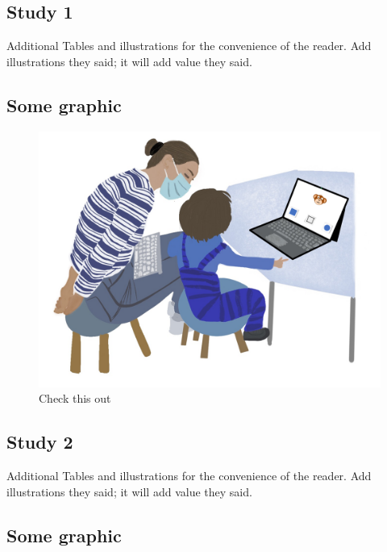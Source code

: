 \documentclass[
  man]{apa6}
\begin{document}
\subsection{Study 1}\label{study-1-1}

Additional Tables and illustrations for the convenience of the reader. Add illustrations they said; it will add value they said.

\subsection{Some graphic}\label{some-graphic}

\begin{figure}

{\centering \includegraphics{../illustrations/Symlit_Rep_Setup_fromarrows} 

}

\caption{Check this out}\label{fig:suppl-setup3}
\end{figure}

\subsection{Study 2}\label{study-2-1}

Additional Tables and illustrations for the convenience of the reader. Add illustrations they said; it will add value they said.

\subsection{Some graphic}\label{some-graphic-1}
\end{document}
